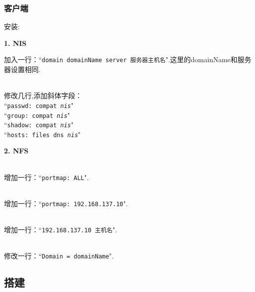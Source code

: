 \subsubsection{客户端}
安装:
\\
\par
\textbf{1. NIS}
\par
{}
\par
加入一行：``\texttt{domain domainName server 服务器主机名}".这里的domainName和服务器设置相同.
\par
{}
\\\indent
修改几行,添加斜体字段：\\
``\texttt{passwd: compat \textit{nis}}"\\
``\texttt{group: compat \textit{nis}}"\\
``\texttt{shadow: compat \textit{nis}}"\\
``\texttt{hosts: files dns \textit{nis}}"

\par
\textbf{2. NFS}
\par
{}
\\\indent 增加一行：``\texttt{portmap: ALL}".
\par
{}
\\\indent 增加一行：``\texttt{portmap: 192.168.137.10}".
\par
{}
\\\indent 增加一行：``\texttt{192.168.137.10   主机名}".
\par
{}
\\\indent 修改一行：``\texttt{Domain = domainName}".
\par
{}
\par
{}

\subsection{搭建}
